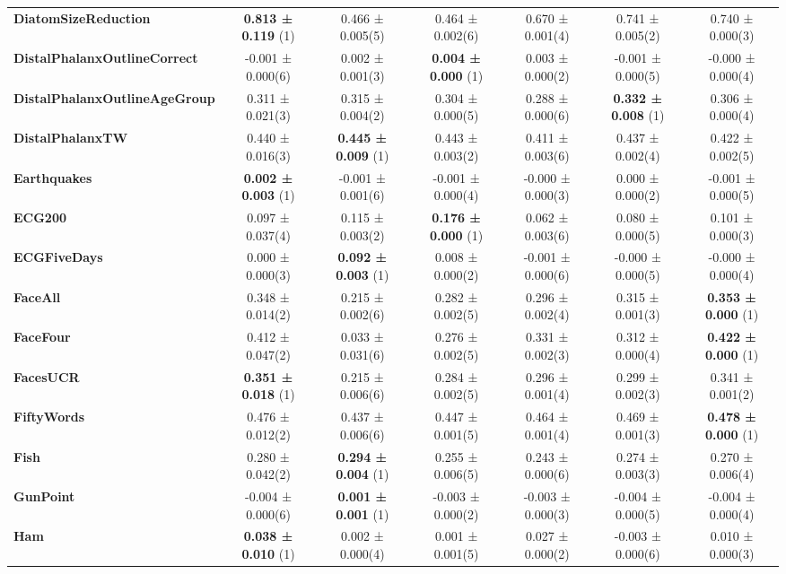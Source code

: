 \begin{table}[ht]
\begin{adjustbox}{width=\textwidth}
\begin{tabular}{lcccccc}
    \textbf{DiatomSizeReduction} & \textbf{0.813 ± 0.119} (1) & 0.466 ± 0.005(5) & 0.464 ± 0.002(6) & 0.670 ± 0.001(4) & 0.741 ± 0.005(2) & 0.740 ± 0.000(3) \\
    \textbf{DistalPhalanxOutlineCorrect} & -0.001 ± 0.000(6) & 0.002 ± 0.001(3) & \textbf{0.004 ± 0.000} (1) & 0.003 ± 0.000(2) & -0.001 ± 0.000(5) & -0.000 ± 0.000(4) \\
    \textbf{DistalPhalanxOutlineAgeGroup} & 0.311 ± 0.021(3) & 0.315 ± 0.004(2) & 0.304 ± 0.000(5) & 0.288 ± 0.000(6) & \textbf{0.332 ± 0.008} (1) & 0.306 ± 0.000(4) \\
    \textbf{DistalPhalanxTW} & 0.440 ± 0.016(3) & \textbf{0.445 ± 0.009} (1) & 0.443 ± 0.003(2) & 0.411 ± 0.003(6) & 0.437 ± 0.002(4) & 0.422 ± 0.002(5) \\
    \textbf{Earthquakes} & \textbf{0.002 ± 0.003} (1) & -0.001 ± 0.001(6) & -0.001 ± 0.000(4) & -0.000 ± 0.000(3) & 0.000 ± 0.000(2) & -0.001 ± 0.000(5) \\
    \textbf{ECG200} & 0.097 ± 0.037(4) & 0.115 ± 0.003(2) & \textbf{0.176 ± 0.000} (1) & 0.062 ± 0.003(6) & 0.080 ± 0.000(5) & 0.101 ± 0.000(3) \\
    \textbf{ECGFiveDays} & 0.000 ± 0.000(3) & \textbf{0.092 ± 0.003} (1) & 0.008 ± 0.000(2) & -0.001 ± 0.000(6) & -0.000 ± 0.000(5) & -0.000 ± 0.000(4) \\
    \textbf{FaceAll} & 0.348 ± 0.014(2) & 0.215 ± 0.002(6) & 0.282 ± 0.002(5) & 0.296 ± 0.002(4) & 0.315 ± 0.001(3) & \textbf{0.353 ± 0.000} (1) \\
    \textbf{FaceFour} & 0.412 ± 0.047(2) & 0.033 ± 0.031(6) & 0.276 ± 0.002(5) & 0.331 ± 0.002(3) & 0.312 ± 0.000(4) & \textbf{0.422 ± 0.000} (1) \\
    \textbf{FacesUCR} & \textbf{0.351 ± 0.018} (1) & 0.215 ± 0.006(6) & 0.284 ± 0.002(5) & 0.296 ± 0.001(4) & 0.299 ± 0.002(3) & 0.341 ± 0.001(2) \\
    \textbf{FiftyWords} & 0.476 ± 0.012(2) & 0.437 ± 0.006(6) & 0.447 ± 0.001(5) & 0.464 ± 0.001(4) & 0.469 ± 0.001(3) & \textbf{0.478 ± 0.000} (1) \\
    \textbf{Fish} & 0.280 ± 0.042(2) & \textbf{0.294 ± 0.004} (1) & 0.255 ± 0.006(5) & 0.243 ± 0.000(6) & 0.274 ± 0.003(3) & 0.270 ± 0.006(4) \\
    \textbf{GunPoint} & -0.004 ± 0.000(6) & \textbf{0.001 ± 0.001} (1) & -0.003 ± 0.000(2) & -0.003 ± 0.000(3) & -0.004 ± 0.000(5) & -0.004 ± 0.000(4) \\
    \textbf{Ham} & \textbf{0.038 ± 0.010} (1) & 0.002 ± 0.000(4) & 0.001 ± 0.001(5) & 0.027 ± 0.000(2) & -0.003 ± 0.000(6) & 0.010 ± 0.000(3) \\

\end{tabular}
\end{adjustbox}
\end{table}

